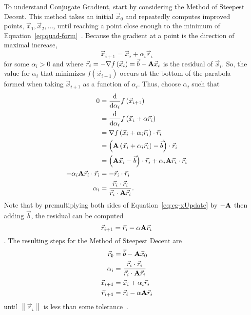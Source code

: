 To understand Conjugate Gradient, start by considering the Method of Steepest Decent.
This method takes an initial \(\vec{x}_0\) and repeatedly computes improved points, \(\vec{x}_1, \vec{x}_2, \dots\), until reaching a point close enough to the minimum of Equation~\ref{eq:quad-form}~\cite{Nearing:2010:toolsForPhysics}.
Because the gradient at a point is the direction of maximal increase, 
\begin{equation}
\label{eq:cg-xUpdate}
	\vec{x}_{i+1} = \vec{x}_i + \alpha_i \vec{r}_i
\end{equation}
for some \(\alpha_i > 0\) and where \(\vec{r}_i = -\nabla f\left(\vec{x}_i\right) = \vec{b} - \mathbf{A}\vec{x}_i\) is the residual of \(\vec{x}_i\).
So, the value for \(\alpha_i\) that minimizes \(f\left(\vec{x}_{i+1}\right)\) occurs at the bottom of the parabola formed when taking \(\vec{x}_{i+1}\) as a function of \(\alpha_i\).
Thus, choose \(\alpha_i\) such that
\begin{align*}
	0
	&= \frac{\mathrm{d}}{\mathrm{d} \alpha_i} f\left(\vec{x}_{i+1}\right) \\
	&= \frac{\mathrm{d}}{\mathrm{d} \alpha_i} f\left(\vec{x}_i + \alpha \vec{r}_i\right) \\
	&= \nabla f\left(\vec{x}_i+\alpha_i\vec{r}_i\right) \cdot \vec{r}_i \\
	&= \left(\mat{A}\left(\vec{x}_i+\alpha_i\vec{r}_i\right)-\vec{b}\right)\cdot \vec{r}_i \\
	&= \left(\mat{A}\vec{x}_i-\vec{b}\right)\cdot \vec{r}_i + \alpha_i\mat{A}\vec{r}_i\cdot \vec{r}_i\\
%
	-\alpha_i\mat{A}\vec{r}_i\cdot \vec{r}_i
	&= -\vec{r}_i\cdot \vec{r}_i \\
%
	\alpha_i
	&= \frac{\vec{r}_i\cdot \vec{r}_i}{\vec{r}_i\cdot\mat{A}\vec{r}_i}.
\end{align*}
Note that by premultiplying both sides of Equation~\ref{eq:cg-xUpdate} by \(-\mathbf{A}\) then adding \(\vec{b}\), the residual can be computed
\[
	\vec{r}_{i+1} = \vec{r}_i - \alpha\mathbf{A}\vec{r}_i
\].
The resulting steps for the Method of Steepest Decent are
\begin{align*}
	\vec{r}_0 &= \vec{b} - \mathbf{A}\vec{x}_0 \\
	\alpha_i &= \frac{\vec{r}_i\cdot \vec{r}_i}{\vec{r}_i\cdot\mathbf{A}\vec{r}_i}\\
	\vec{x}_{i+1} &= \vec{x}_i + \alpha_i\vec{r}_i\\
	\vec{r}_{i+1} &= \vec{r}_i - \alpha\mathbf{A}\vec{r}_i
\end{align*}
until \(\left\|\vec{r}_i\right\|\) is less than some tolerance~\cite{Shewchuk:1994:IntroToCG}.


